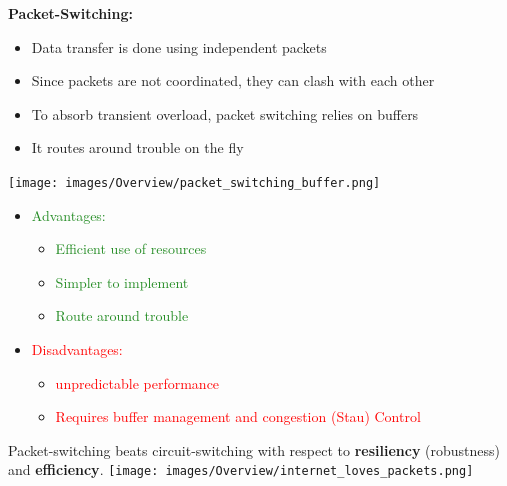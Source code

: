 \documentclass[a4paper, fontsize=8pt, landscape, DIV=1]{scrartcl}
\begin{document}
\begin{multicols*}{4}
				\textbf{Packet-Switching:}
				\vspace{-0.2cm}
				\begin{itemize}[noitemsep]
					\item Data transfer is done using independent packets 
					\item Since packets are not coordinated, they can clash with each other \
					\item To absorb transient overload, packet switching relies on buffers 
					\item It routes around trouble on the fly
				\end{itemize}
				\texttt{[image: images/Overview/packet\_switching\_buffer.png]}
				\begin{itemize}[noitemsep]
					\item \textcolor{ForestGreen}{Advantages:}
					\begin{itemize}
						\item \textcolor{ForestGreen}{Efficient use of resources} 
						\item \textcolor{ForestGreen}{Simpler to implement}
						\item \textcolor{ForestGreen}{Route around trouble}
					\end{itemize}
					\item \textcolor{red}{Disadvantages:}
					\begin{itemize}
						\item \textcolor{red}{unpredictable performance}
						\item \textcolor{red}{Requires buffer management and congestion (Stau) Control}
					\end{itemize} 
				\end{itemize}
				Packet-switching beats circuit-switching with respect to \textbf{resiliency} (robustness) and \textbf{efficiency}. 
				\texttt{[image: images/Overview/internet\_loves\_packets.png]}
			\newpage
			

\end{multicols*}
\end{document}

